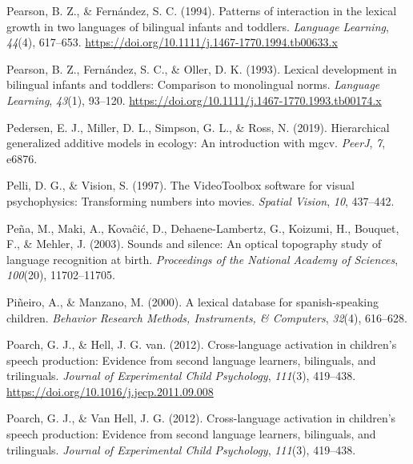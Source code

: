 \documentclass[
  12pt,
  b5paperpaper,
  twoside]{scrreprt}
\newlength{\cslhangindent}
\newlength{\cslentryspacingunit} %
\newenvironment{CSLReferences}[2] %
 {%
  \setlength{\parindent}{0pt}
  \ifodd #1
  \let\oldpar\par
  \def\par{\hangindent=\cslhangindent\oldpar}
  \fi
  \setlength{\parskip}{#2\cslentryspacingunit}
 }%
 {}
\begin{document}
\begin{CSLReferences}{1}{0}
\leavevmode{}%
Pearson, B. Z., \& Fernández, S. C. (1994). Patterns of interaction in
the lexical growth in two languages of bilingual infants and toddlers.
\emph{Language Learning}, \emph{44}(4), 617--653.
\url{https://doi.org/10.1111/j.1467-1770.1994.tb00633.x}

\leavevmode{}%
Pearson, B. Z., Fernández, S. C., \& Oller, D. K. (1993). Lexical
development in bilingual infants and toddlers: Comparison to monolingual
norms. \emph{Language Learning}, \emph{43}(1), 93--120.
\url{https://doi.org/10.1111/j.1467-1770.1993.tb00174.x}

\leavevmode{}%
Pedersen, E. J., Miller, D. L., Simpson, G. L., \& Ross, N. (2019).
Hierarchical generalized additive models in ecology: An introduction
with mgcv. \emph{PeerJ}, \emph{7}, e6876.

\leavevmode{}%
Pelli, D. G., \& Vision, S. (1997). The VideoToolbox software for visual
psychophysics: Transforming numbers into movies. \emph{Spatial Vision},
\emph{10}, 437--442.

\leavevmode{}%
Peña, M., Maki, A., Kovaĉić, D., Dehaene-Lambertz, G., Koizumi, H.,
Bouquet, F., \& Mehler, J. (2003). Sounds and silence: An optical
topography study of language recognition at birth. \emph{Proceedings of
the National Academy of Sciences}, \emph{100}(20), 11702--11705.

\leavevmode{}%
Piñeiro, A., \& Manzano, M. (2000). A lexical database for
spanish-speaking children. \emph{Behavior Research Methods, Instruments,
\& Computers}, \emph{32}(4), 616--628.

\leavevmode{}%
Poarch, G. J., \& Hell, J. G. van. (2012). Cross-language activation in
children's speech production: Evidence from second language learners,
bilinguals, and trilinguals. \emph{Journal of Experimental Child
Psychology}, \emph{111}(3), 419--438.
\url{https://doi.org/10.1016/j.jecp.2011.09.008}

\leavevmode{}%
Poarch, G. J., \& Van Hell, J. G. (2012). Cross-language activation in
children's speech production: Evidence from second language learners,
bilinguals, and trilinguals. \emph{Journal of Experimental Child
Psychology}, \emph{111}(3), 419--438.


\end{CSLReferences}
\end{document}
